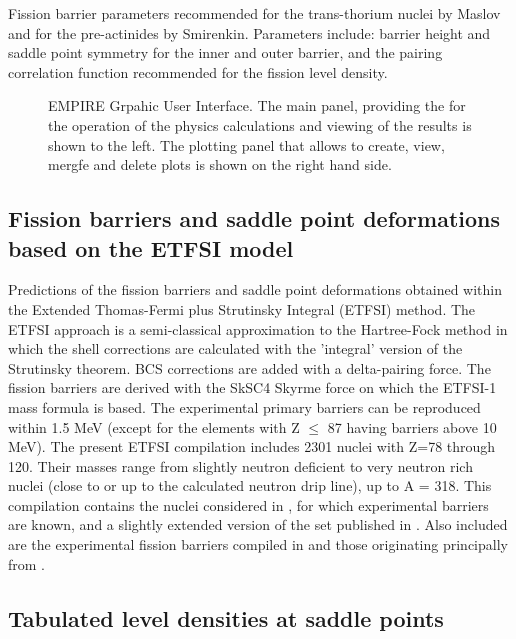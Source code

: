 Fission barrier parameters recommended for the trans-thorium nuclei by
Maslov and for the pre-actinides by Smirenkin. Parameters include: barrier
height and saddle point symmetry for the inner and outer barrier, and the
pairing correlation function recommended for the fission level density.

\begin{figure*}[htbp]
 
\caption{EMPIRE Grpahic User Interface. The main panel, providing the for
the operation of the physics calculations and viewing of the results is
shown to the left. The plotting panel that allows to create, view, mergfe
and delete plots is shown on the right hand side.}
\label{fig:GUI}
\end{figure*}

\subsection{Fission barriers and saddle point deformations based on the
ETFSI model}

Predictions of the fission barriers and saddle point deformations obtained
within the Extended Thomas-Fermi plus Strutinsky Integral (ETFSI) method.
The ETFSI approach is a semi-classical approximation to the Hartree-Fock
method in which the shell corrections are calculated with the 'integral'
version of the Strutinsky theorem. BCS corrections are added with a
delta-pairing force. The fission barriers are derived with the SkSC4 Skyrme
force on which the ETFSI-1 mass formula is based. The experimental primary
barriers can be reproduced within 1.5 MeV (except for the elements with Z $%
\le$ 87 having barriers above 10 MeV). The present ETFSI compilation
includes 2301 nuclei with Z=78 through 120. Their masses range from slightly
neutron deficient to very neutron rich nuclei (close to or up to the
calculated neutron drip line), up to A = 318. This compilation contains the
nuclei considered in \cite{Mamdouh1998}, for which experimental barriers are
known, and a slightly extended version of the set published in \cite%
{Mamdouh(2001)}. Also included are the experimental fission barriers
compiled in \cite{Mamdouh1998} and those originating principally from \cite%
{Smirenkin1993}.

\subsection{Tabulated level densities at saddle points}


